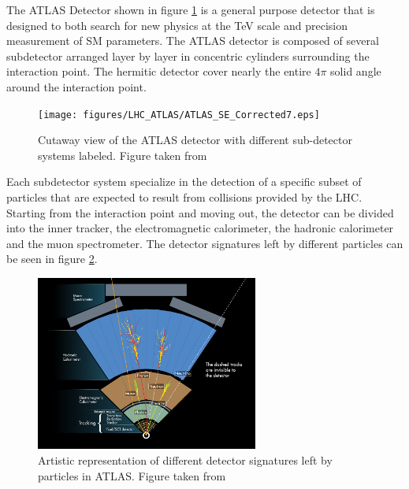 \indent The ATLAS Detector shown in figure \ref{LHC:fig:ATLASDet} is a general purpose detector that is designed to both search for new physics at the TeV scale and precision measurement of SM parameters.\cite{ATLAS_JINST}  The ATLAS detector is composed of several subdetector arranged layer by layer in concentric cylinders surrounding the interaction point.  The hermitic detector cover nearly the entire $4\pi$ solid angle around the interaction point. \\

\begin{figure}[h!]
\centering
\texttt{[image: figures/LHC\_ATLAS/ATLAS\_SE\_Corrected7.eps]}
\caption{ Cutaway view of the ATLAS detector with different sub-detector systems labeled. Figure taken from \cite{ATLAS_JINST} \label{LHC:fig:ATLASDet}}
\end{figure}

\indent Each subdetector system specialize in the detection of a specific subset of particles that are expected to result from collisions provided by the LHC.  Starting from the interaction point and moving out, the detector can be divided into the inner tracker, the electromagnetic calorimeter, the hadronic calorimeter and the muon spectrometer.  The detector signatures left by different particles can be seen in figure \ref{LHC:fig:ATLASSig}. \\

\begin{figure}[h!]
\centering
\includegraphics[width=0.65\textwidth, angle=0]{figures/LHC_ATLAS/ATLAS_Signature.jpg}
\caption{ Artistic representation of different detector signatures left by particles in ATLAS. Figure taken from \cite{ATLASSig} \label{LHC:fig:ATLASSig}}
\end{figure}

